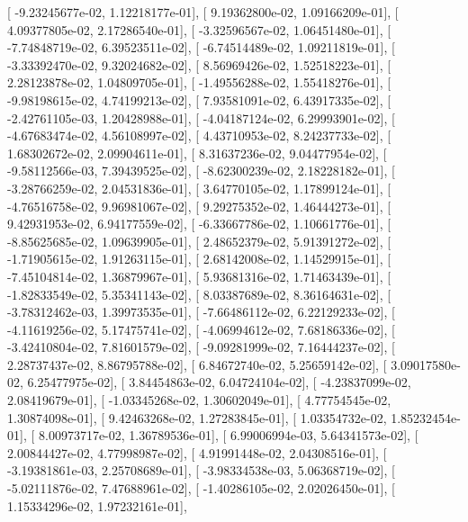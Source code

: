 \documentclass{article}
\begin{document}
       [ -9.23245677e-02,   1.12218177e-01],
       [  9.19362800e-02,   1.09166209e-01],
       [  4.09377805e-02,   2.17286540e-01],
       [ -3.32596567e-02,   1.06451480e-01],
       [ -7.74848719e-02,   6.39523511e-02],
       [ -6.74514489e-02,   1.09211819e-01],
       [ -3.33392470e-02,   9.32024682e-02],
       [  8.56969426e-02,   1.52518223e-01],
       [  2.28123878e-02,   1.04809705e-01],
       [ -1.49556288e-02,   1.55418276e-01],
       [ -9.98198615e-02,   4.74199213e-02],
       [  7.93581091e-02,   6.43917335e-02],
       [ -2.42761105e-03,   1.20428988e-01],
       [ -4.04187124e-02,   6.29993901e-02],
       [ -4.67683474e-02,   4.56108997e-02],
       [  4.43710953e-02,   8.24237733e-02],
       [  1.68302672e-02,   2.09904611e-01],
       [  8.31637236e-02,   9.04477954e-02],
       [ -9.58112566e-03,   7.39439525e-02],
       [ -8.62300239e-02,   2.18228182e-01],
       [ -3.28766259e-02,   2.04531836e-01],
       [  3.64770105e-02,   1.17899124e-01],
       [ -4.76516758e-02,   9.96981067e-02],
       [  9.29275352e-02,   1.46444273e-01],
       [  9.42931953e-02,   6.94177559e-02],
       [ -6.33667786e-02,   1.10661776e-01],
       [ -8.85625685e-02,   1.09639905e-01],
       [  2.48652379e-02,   5.91391272e-02],
       [ -1.71905615e-02,   1.91263115e-01],
       [  2.68142008e-02,   1.14529915e-01],
       [ -7.45104814e-02,   1.36879967e-01],
       [  5.93681316e-02,   1.71463439e-01],
       [ -1.82833549e-02,   5.35341143e-02],
       [  8.03387689e-02,   8.36164631e-02],
       [ -3.78312462e-03,   1.39973535e-01],
       [ -7.66486112e-02,   6.22129233e-02],
       [ -4.11619256e-02,   5.17475741e-02],
       [ -4.06994612e-02,   7.68186336e-02],
       [ -3.42410804e-02,   7.81601579e-02],
       [ -9.09281999e-02,   7.16444237e-02],
       [  2.28737437e-02,   8.86795788e-02],
       [  6.84672740e-02,   5.25659142e-02],
       [  3.09017580e-02,   6.25477975e-02],
       [  3.84454863e-02,   6.04724104e-02],
       [ -4.23837099e-02,   2.08419679e-01],
       [ -1.03345268e-02,   1.30602049e-01],
       [  4.77754545e-02,   1.30874098e-01],
       [  9.42463268e-02,   1.27283845e-01],
       [  1.03354732e-02,   1.85232454e-01],
       [  8.00973717e-02,   1.36789536e-01],
       [  6.99006994e-03,   5.64341573e-02],
       [  2.00844427e-02,   4.77998987e-02],
       [  4.91991448e-02,   2.04308516e-01],
       [ -3.19381861e-03,   2.25708689e-01],
       [ -3.98334538e-03,   5.06368719e-02],
       [ -5.02111876e-02,   7.47688961e-02],
       [ -1.40286105e-02,   2.02026450e-01],
       [  1.15334296e-02,   1.97232161e-01],
\end{document}
